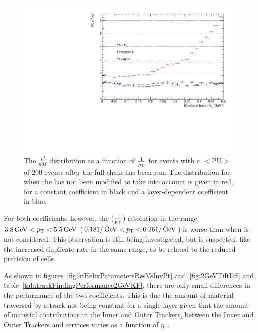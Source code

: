 \begin{figure}[tbp]
\centering
\includegraphics[width=\textwidth]{figs/tk-upgrade/results-lowPtTracking/kfChi2NdfVsInvPtTiltedGeometry_5000.pdf}
\caption{The $\frac{\chi^{2}}{ndf}$ distribution as a function of $\frac{1}{p_{\mathrm{T}}}$ for \ttbar events with a $<\textrm{PU}>$ of 200 events after the full chain has been run. The distribution for when the \KF has not been modified to take \MS into account is given in red, for a constant \MS coefficient in black and a layer-dependent \MS coefficient in blue.
}
\label{fig:2GeVTiltChi2Ndf}	
\end{figure}

For both \MS coefficients, however, the \pt($\frac{1}{p_{\mathrm{T}}}$) resolution in the range $3.8 \,\text{Ge\hspace{-.08em}V} < p_{\mathrm{T}} < 5.5\,\text{Ge\hspace{-.08em}V}$ ($0.18 1/\,\text{Ge\hspace{-.08em}V} < p_{\mathrm{T}} < 0.26 1/\,\text{Ge\hspace{-.08em}V}$) is worse than when \MS is not considered.
This observation is still being investigated, but is suspected, like the increased duplicate rate in the same \pT range, to be related to the reduced precision of \HT cells.

As shown in figures~\ref{fig:kfHelixParametersResVsInvPt} and~\ref{fig:2GeVTiltEff} and table~\ref{tab:trackFindingPerformance2GeVKF}, there are only small differences in the performance of the two \MS coefficients.
This is due the amount of material traversed by a track not being constant for a single layer given that the amount of material contributions in the Inner and Outer Trackers, between the Inner and Outer Trackers and services varies as a function of $\eta$~\cite{P2TrackerTDR}.

